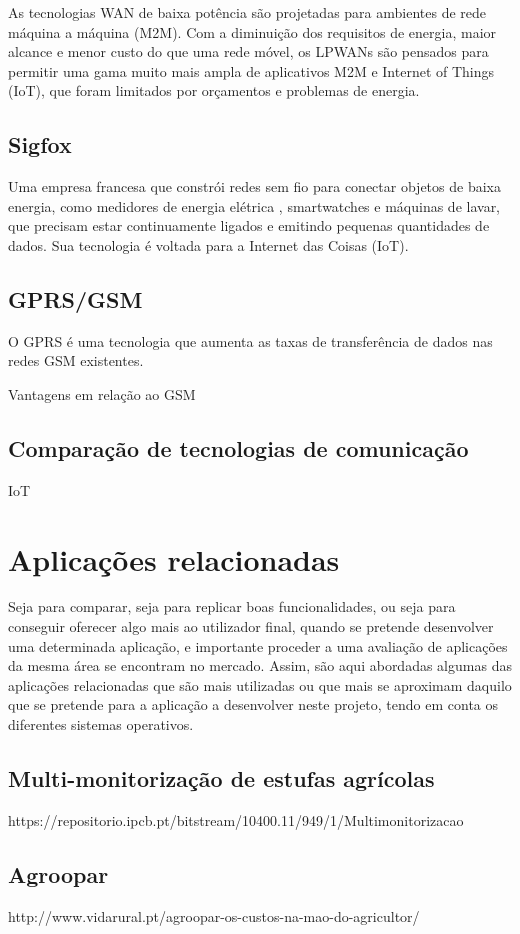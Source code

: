 As tecnologias WAN de baixa potência são projetadas para ambientes de rede máquina a máquina (M2M). Com a diminuição dos requisitos de energia, maior alcance e menor custo do que uma rede móvel, os LPWANs são pensados para permitir uma gama muito mais ampla de aplicativos M2M e Internet of Things (IoT), que foram limitados por orçamentos e problemas de energia.



\subsection{Sigfox}

Uma empresa francesa que constrói redes sem fio para conectar objetos de baixa energia, como medidores de energia elétrica , smartwatches e máquinas de lavar, que precisam estar continuamente ligados e emitindo pequenas quantidades de dados. Sua tecnologia é voltada para a Internet das Coisas (IoT).
 


\subsection{GPRS/GSM}


O \ac{GPRS} é uma tecnologia que aumenta as taxas de transferência de dados nas redes \ac{GSM} existentes. 


Vantagens em relação ao GSM


\subsection{Comparação de tecnologias de comunicação}





\ac{IoT}


\section{Aplicações relacionadas}



Seja para comparar, seja para replicar boas funcionalidades, ou seja para conseguir oferecer algo mais ao utilizador final, quando se pretende desenvolver uma determinada aplicação, e
importante proceder a uma avaliação de aplicações da mesma área se encontram no mercado.
Assim, são aqui abordadas algumas das aplicações relacionadas que são mais utilizadas ou que mais se aproximam daquilo que se pretende para a aplicação a desenvolver neste projeto,
tendo em conta os diferentes sistemas operativos.



\subsection{Multi-monitorização de estufas agrícolas }

https://repositorio.ipcb.pt/bitstream/10400.11/949/1/Multimonitorizacao%

\subsection{Agroopar}

http://www.vidarural.pt/agroopar-os-custos-na-mao-do-agricultor/
